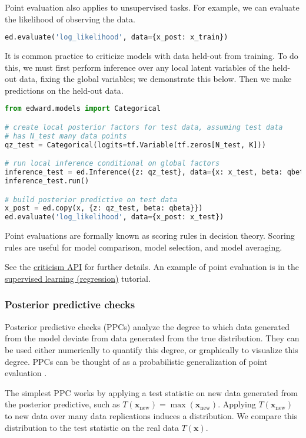 Point evaluation also applies to unsupervised tasks. For example, we
can evaluate the likelihood of observing the data.
\begin{lstlisting}[language=Python]
ed.evaluate('log_likelihood', data={x_post: x_train})
\end{lstlisting}

It is common practice to criticize models with data held-out from
training. To do this, we must first perform inference over any local
latent variables of the held-out data, fixing the global variables; we
demonstrate this below. Then we make predictions on the held-out data.

\begin{lstlisting}[language=Python]
from edward.models import Categorical

# create local posterior factors for test data, assuming test data
# has N_test many data points
qz_test = Categorical(logits=tf.Variable(tf.zeros[N_test, K]))

# run local inference conditional on global factors
inference_test = ed.Inference({z: qz_test}, data={x: x_test, beta: qbeta})
inference_test.run()

# build posterior predictive on test data
x_post = ed.copy(x, {z: qz_test, beta: qbeta}})
ed.evaluate('log_likelihood', data={x_post: x_test})
\end{lstlisting}

Point evaluations are formally known as scoring rules
in decision theory. Scoring rules are useful for model comparison, model
selection, and model averaging.

See the \href{/api/criticism}{criticism API} for further details.
An example of point evaluation is in the
\href{/tutorials/supervised-regression}{supervised learning
(regression)} tutorial.

\subsubsection{Posterior predictive checks}

Posterior predictive checks (PPCs)
analyze the degree to which data generated from the model deviate from
data generated from the true distribution. They can be used either
numerically to quantify this degree, or graphically to visualize this
degree. PPCs can be thought of as a probabilistic generalization of
point evaluation
\citep{box1980sampling,rubin1984bayesianly,meng1994posterior,gelman1996posterior}.

The simplest PPC works by applying a test statistic on new data
generated from the posterior predictive, such as
$T(\mathbf{x}_\text{new}) = \max(\mathbf{x}_\text{new})$.  Applying
$T(\mathbf{x}_\text{new})$ to new data over many data replications
induces a distribution. We compare this distribution to the test
statistic on the real data $T(\mathbf{x})$.

